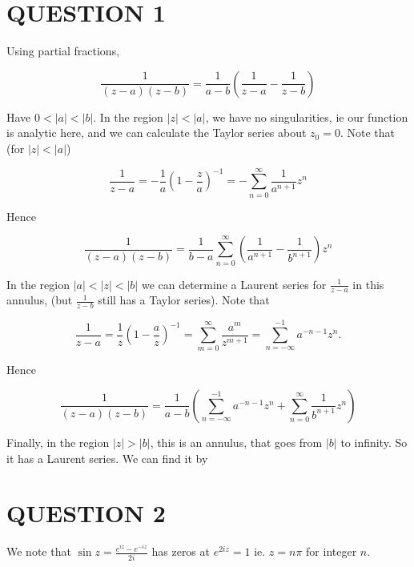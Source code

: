 \documentclass[a4paper]{article}
\begin{document}
	
\maketitle

\section{QUESTION 1}
Using partial fractions,

\[ \frac{1}{(z-a)(z-b)} = \frac{1}{a-b} \left(   \frac{1}{z-a} - \frac{1}{z - b} \right)  \]


Have $ 0 < | a | < | b | $. In the region $ | z | < | a | $, we have no singularities,  ie our function is analytic here, and we can calculate the  Taylor series about $ z_{0} = 0 $. Note that (for $ | z | < | a | $)

\[ \frac{1}{z - a} = - \frac{1}{a} \left(  1 - \frac{z}{a} \right)^{-1} = - \sum_{n=0}^{\infty} \frac{1}{a^{n+1}} z^{n}  \]


Hence 

\[ \frac{1}{(z-a)(z-b)} = \frac{1}{b-a} \sum_{n=0}^{\infty} \left(  \frac{1}{a^{n+1}} - \frac{1}{b^{n+1}} \right)  z^{n}   \]




In the region $ | a | < | z | < | b | $ we can determine a Laurent series for $ \frac{1}{z-a} $ in this annulus, (but $ \frac{1}{z-b} $ still has a Taylor series). Note that 

 \[
\frac{1}{z - a} = \frac{1}{z} \left(1 - \frac{a}{z}\right)^{-1} = \sum_{m = 0}^\infty \frac{a^m}{z^{m + 1}} = \sum_{n = -\infty}^{-1} a^{-n - 1} z^n.
\]


Hence

\[ \frac{1}{(z-a)(z-b)} = \frac{1}{a-b} \left(  \sum_{n = -\infty}^{-1} a^{-n - 1} z^n + \sum_{n=0}^{\infty} \frac{1}{b^{n+1}} z^{n}   \right)   \]



Finally, in the region $ | z | > | b | $, this is an annulus, that goes from $|b|$ to infinity. So it has a Laurent series. We can find it by






\section{QUESTION 2}

We note that $ \sin z = \frac{e^{iz} - e^{-iz}}{2i} $ has zeros at $ e^{2iz} = 1 $ ie. $ z = n \pi $ for integer $ n $. 
\end{document}
